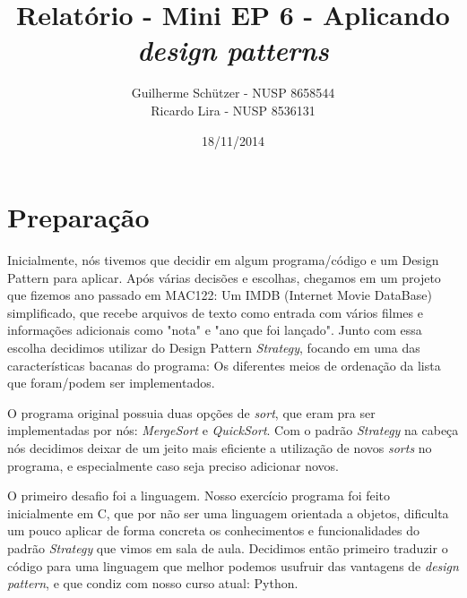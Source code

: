 \documentclass[a4paper]{article}
\title{Relatório - Mini EP 6 - Aplicando \emph{design patterns}}
\author{
Guilherme Schützer - NUSP 8658544 \\
Ricardo Lira       - NUSP 8536131
}
\date{18/11/2014}
\begin{document}
\maketitle

\section{Preparação}


	Inicialmente, nós tivemos que decidir em algum programa/código e um Design Pattern
para aplicar. Após várias decisões e escolhas, chegamos em um projeto que fizemos
ano passado em MAC122: Um IMDB (Internet Movie DataBase) simplificado, que recebe
arquivos de texto como entrada com vários filmes e informações adicionais como "nota"
e "ano que foi lançado". Junto com essa escolha decidimos utilizar do Design Pattern \emph{Strategy}, focando em uma das características bacanas do programa: Os diferentes meios de ordenação da lista que foram/podem ser implementados.

	O programa original possuia duas opções de \emph{sort}, que eram pra ser implementadas por nós: \emph{MergeSort} e \emph{QuickSort}. Com o padrão \emph{Strategy} na cabeça nós decidimos deixar de um jeito mais eficiente a utilização de novos \emph{sorts} no programa, e especialmente caso seja preciso adicionar novos.

	O primeiro desafio foi a linguagem. Nosso exercício programa foi feito inicialmente em C,
que por não ser uma linguagem orientada a objetos, dificulta um pouco aplicar de forma concreta os conhecimentos e funcionalidades do padrão \emph{Strategy} que vimos em sala de aula. Decidimos então primeiro traduzir o código para uma linguagem que melhor podemos usufruir das vantagens de \emph{design pattern}, e que condiz com nosso curso atual: Python.
\end{document}
